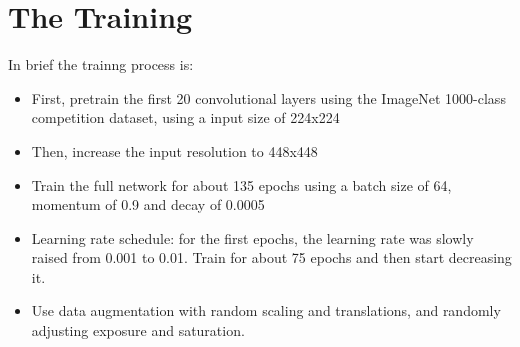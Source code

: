 \chapter[The Training]{The Training}

\regularsection
\headerregularsection

\updatemylof %
\updatemylot %

\begin{sloppypar} %
In brief the trainng process is:

\begin{itemize}
    \item First, pretrain the first 20 convolutional layers using the ImageNet 1000-class competition dataset, using a input size of 224x224
    \item Then, increase the input resolution to 448x448
    \item Train the full network for about 135 epochs using a batch size of 64, momentum of 0.9 and decay of 0.0005
    \item Learning rate schedule: for the first epochs, the learning rate was slowly raised from 0.001 to 0.01. Train for about 75 epochs and then start decreasing it.
    \item Use data augmentation with random scaling and translations, and randomly adjusting exposure and saturation.
\end{itemize}

\end{sloppypar}



